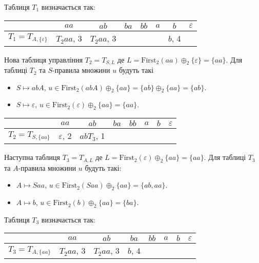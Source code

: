 Таблиця $T_1$ визначається так:
\begin{table}[H]
	\centering
	\begin{tabular}{|c|c|c|c|c|c|c|c|}
		\hline
		 & $aa$ & $ab$ & $ba$ & $bb$ & $a$ & $b$ & $\varepsilon$ \\ \hline
		$T_1 = T_{A, \{\varepsilon\}}$ & $T_2aa$, 3 & $T_2aa$, 3 &  &  &  & $b$, 4 &  \\ \hline
	\end{tabular}
\end{table}

Нова таблиця управління $T_2 = T_{S, L}$ де $L = \text{First}_2 (aa) \oplus_2 \{\varepsilon\} = \{aa\}$. Для таблиці $T_2$ та $S$-правила множини $u$ будуть такі
\begin{itemize}
	\item $S \mapsto abA$, $u \in \text{First}_2(abA) \oplus_2 \{aa\} = \{ab\} \oplus_2 \{aa\} = \{ab\}$.
	\item $S \mapsto \varepsilon$, $u \in \text{First}_2(\varepsilon) \oplus_2 \{aa\} = \{aa\}$.
\end{itemize}

\begin{table}[H]
	\centering
	\begin{tabular}{|c|c|c|c|c|c|c|c|}
		\hline
		 & $aa$ & $ab$ & $ba$ & $bb$ & $a$ & $b$ & $\varepsilon$ \\ \hline
		$T_2 = T_{S, \{aa\}}$ & $\varepsilon$, 2 & $abT_3$, 1 &  &  &  &  &  \\ \hline
	\end{tabular}
\end{table}

Наступна таблиця $T_3 = T_{A, L}$ де $L = \text{First}_2(\varepsilon) \oplus_2 \{aa\} = \{aa\}$. Для таблиці $T_3$ та $A$-правила множини $u$ будуть такі:
\begin{itemize}
	\item $A \mapsto Saa$, $u \in \text{First}_2(Saa) \oplus_2 \{aa\} = \{ab, aa\}$.
	\item $A \mapsto b$, $u \in \text{First}_2(b) \oplus_2 \{aa\} = \{ba\}$.
\end{itemize}

Таблиця $T_3$ визначається так:
\begin{table}[H]
	\centering
	\begin{tabular}{|c|c|c|c|c|c|c|c|}
		\hline
		 & $aa$ & $ab$ & $ba$ & $bb$ & $a$ & $b$ & $\varepsilon$ \\ \hline
		$T_3 = T_{A, \{aa\}}$ & $T_2aa$, 3 & $T_2aa$, 3 & $b$, 4 &  &  &  &  \\ \hline
	\end{tabular}
\end{table}

